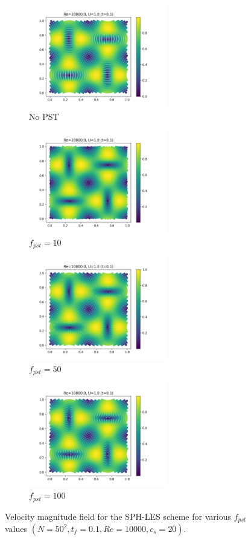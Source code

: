 \begin{figure}[H]
  \begin{subfigure}{7cm}
    \centering\includegraphics[width=6cm]{Code-Figures/okra2022/pst/c0_20_tait_pec_dtmul_1_nx_50_pst_-1_re_10000_ok2022/final_vmag.png}
    \caption{No PST}
  \end{subfigure}
  \begin{subfigure}{7cm}
    \centering\includegraphics[width=6cm]{Code-Figures/okra2022/pst/c0_20_tait_pec_dtmul_1_nx_50_pst_10_re_10000_ok2022/final_vmag.png}
    \caption{$f_{pst} = 10$}
  \end{subfigure}
  \begin{subfigure}{7cm}
    \centering\includegraphics[width=6cm]{Code-Figures/okra2022/pst/c0_20_tait_pec_dtmul_1_nx_50_pst_50_re_10000_ok2022/final_vmag.png}
    \caption{$f_{pst} = 50$}
  \end{subfigure}
  \begin{subfigure}{7cm}
    \centering\includegraphics[width=6cm]{Code-Figures/okra2022/pst/c0_20_tait_pec_dtmul_1_nx_50_pst_100_re_10000_ok2022/final_vmag.png}
    \caption{$f_{pst} = 100$}
  \end{subfigure}
  \caption{Velocity magnitude field for the SPH-LES scheme for various $f_{pst}$ values $(N=50^2, t_f=0.1, Re=10000, c_s=20)$.}
  \label{fig:okra2022-pst-vmag}
\end{figure}

